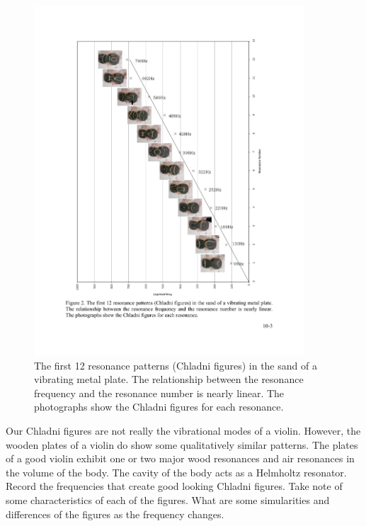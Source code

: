 \documentclass[11pt]{NSF}
\begin{document}
\begin{figure}[hbtp]
\begin{center}
\includegraphics[width=0.9\textwidth]{fig10_2}
\caption{The first 12 resonance patterns (Chladni figures) in the sand
of a vibrating metal plate. The relationship between the resonance
frequency and the resonance number is nearly linear. The photographs
show the Chladni figures for each resonance.}
\label{f:2}
\end{center}
\end{figure}
%

Our Chladni figures are not really the vibrational modes of a violin.
However, the wooden plates of a violin do show some qualitatively
similar patterns. 
The plates of a good violin exhibit one or two major wood resonances 
and air resonances in the volume of the body. The cavity of the body acts as a Helmholtz resonator.
 \\


Record the frequencies that create good looking Chladni figures. Take note of some characteristics of each of the figures. What are some simularities and differences of the figures as the frequency changes.
\\
\end{document}

